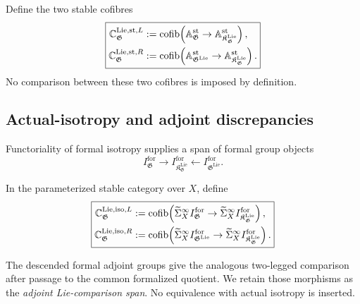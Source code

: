 \begin{definition}
\label{def:bnli-stable-discrepancy}
Define the two stable cofibres
\[
\boxed{
\begin{aligned}
    \mathbb C^{\mathrm{Lie,st},L}_{\mathfrak G}
    &:={\rm cofib}\!\left(
      \mathbb A^{\mathrm{st}}_{\mathfrak G}
      \to
      \mathbb A^{\mathrm{st}}_{\mathfrak K_{\mathfrak G}^{\mathrm{Lie}}}
    \right),\\
    \mathbb C^{\mathrm{Lie,st},R}_{\mathfrak G}
    &:={\rm cofib}\!\left(
      \mathbb A^{\mathrm{st}}_{\mathfrak G^{\mathrm{Lie}}}
      \to
      \mathbb A^{\mathrm{st}}_{\mathfrak K_{\mathfrak G}^{\mathrm{Lie}}}
    \right).
\end{aligned}}
\]
No comparison between these two cofibres is imposed by definition.
\end{definition}

\subsection{Actual-isotropy and adjoint discrepancies}

Functoriality of formal isotropy supplies a span of formal group objects
\[
    I^{\mathrm{for}}_{\mathfrak G}
    \longrightarrow
    I^{\mathrm{for}}_{\mathfrak K_{\mathfrak G}^{\mathrm{Lie}}}
    \longleftarrow
    I^{\mathrm{for}}_{\mathfrak G^{\mathrm{Lie}}}.
\]

\begin{definition}
\label{def:bnli-isotropy-discrepancy}
In the parameterized stable category over \(X\), define
\[
\boxed{
\begin{aligned}
    \mathbb C^{\mathrm{Lie,iso},L}_{\mathfrak G}
    &:={\rm cofib}\!\left(
      \widetilde\Sigma_X^\infty I^{\mathrm{for}}_{\mathfrak G}
      \to
      \widetilde\Sigma_X^\infty
      I^{\mathrm{for}}_{\mathfrak K_{\mathfrak G}^{\mathrm{Lie}}}
    \right),\\
    \mathbb C^{\mathrm{Lie,iso},R}_{\mathfrak G}
    &:={\rm cofib}\!\left(
      \widetilde\Sigma_X^\infty I^{\mathrm{for}}_{\mathfrak G^{\mathrm{Lie}}}
      \to
      \widetilde\Sigma_X^\infty
      I^{\mathrm{for}}_{\mathfrak K_{\mathfrak G}^{\mathrm{Lie}}}
    \right).
\end{aligned}}
\]
\end{definition}

The descended formal adjoint groups give the analogous two-legged comparison
after passage to the common formalized quotient.  We retain those morphisms as
the \emph{adjoint Lie-comparison span}.  No equivalence with actual isotropy is
inserted.

